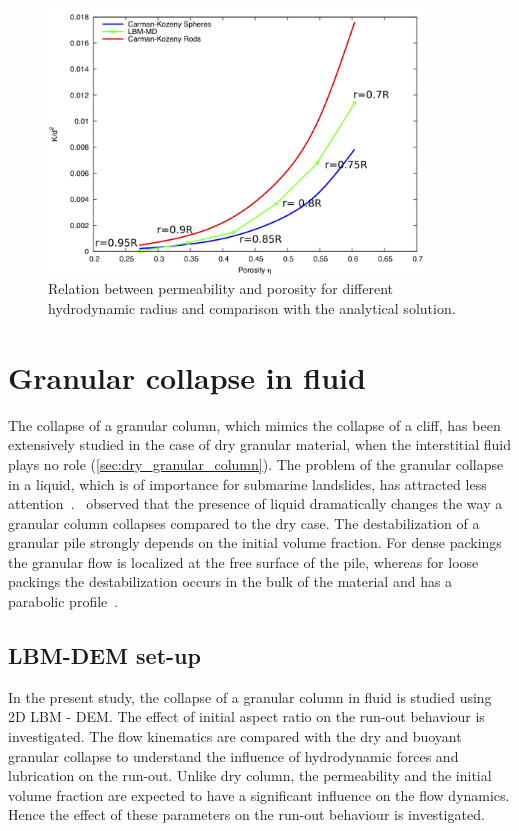 \begin{figure}[htpb]
\centering
\includegraphics[width=0.9\textwidth]{Carman}
\caption{Relation between permeability and porosity for 
different hydrodynamic radius and comparison with the analytical solution.}
\label{fig:Carman}
\end{figure}


\section{Granular collapse in fluid}

The collapse of a granular column, which mimics the
collapse of a cliff, has been extensively studied in the case of
dry granular material, when the interstitial fluid plays no
role (\cref{sec:dry_granular_column}). The problem of the granular collapse 
in a liquid, which is of importance for submarine landslides, has attracted 
less attention~\citep{Rondon2011}.~\citet{Thompson2007} 
observed that the presence of liquid dramatically changes the way a granular 
column collapses compared to the dry case. The destabilization of a granular 
pile strongly depends on the initial volume fraction. For dense 
packings the granular flow is localized at the free surface of the pile, 
whereas for loose packings the destabilization occurs in the bulk of the
material and has a parabolic profile~\citep{Bonnet2010,Topin2011,Iverson2000}. 

\subsection{LBM-DEM set-up}

In the present study, the collapse of a granular column in fluid is studied 
using 2D LBM - DEM. The effect of initial aspect ratio on the run-out behaviour 
is investigated. The flow kinematics are compared with the dry and buoyant 
granular collapse to understand the influence of hydrodynamic forces and 
lubrication on the run-out. Unlike dry column, the permeability and the 
initial volume fraction are expected to have a significant influence on the 
flow dynamics. Hence the effect of these parameters on the run-out behaviour 
is investigated.

